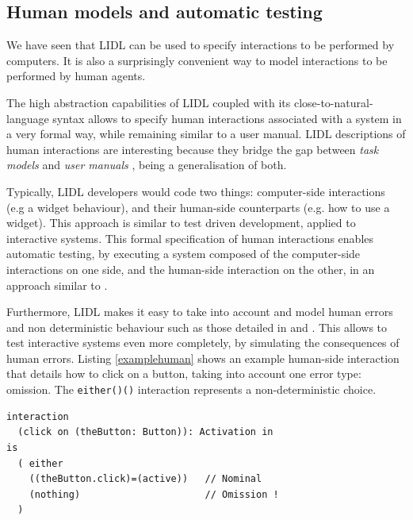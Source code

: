 \documentclass[10pt]{sigplanconf}
\newcommand{\code}[1]{\lstinline{#1}}
\begin{document}
\subsection{Human models and automatic testing}

We have seen that LIDL can be used to specify interactions to be performed by computers. It is also a surprisingly convenient way to model interactions to be performed by human agents.

The high abstraction capabilities of LIDL coupled with its close-to-natural-language syntax allows to specify human interactions associated with a system in a very formal way, while remaining similar to a user manual. LIDL descriptions of human interactions are interesting because they bridge the gap between \emph{task models} and \emph{user manuals} \cite{Bowen:2012:MUM:2305484.2305505}, being a generalisation of both.

Typically, LIDL developers would code two things: computer-side interactions (e.g a widget behaviour), and their human-side counterparts (e.g. how to use a widget). This approach is similar to test driven development, applied to interactive systems. This formal specification of human interactions enables automatic testing, by executing a system composed of the computer-side interactions on one side, and the human-side interaction on the other, in an approach similar to \cite{Barboni:2010:BMI:1822018.1822043}.

Furthermore, LIDL makes it easy to take into account and model human errors and non deterministic behaviour such as those detailed in \cite{bolton2011} and \cite{martinie2014fine}. This allows to test interactive systems even more completely, by simulating the consequences of human errors. Listing \ref{examplehuman} shows an example human-side interaction that details how to click on a button, taking into account one error type: omission. The \code{either()()} interaction represents a non-deterministic choice.


\begin{lstlisting}[caption=LIDL definition of a potentially faulty human interaction,label=examplehuman]
interaction
  (click on (theButton: Button)): Activation in
is
  ( either 
    ((theButton.click)=(active))   // Nominal
    (nothing)                      // Omission !
  )
\end{lstlisting}







\end{document}
